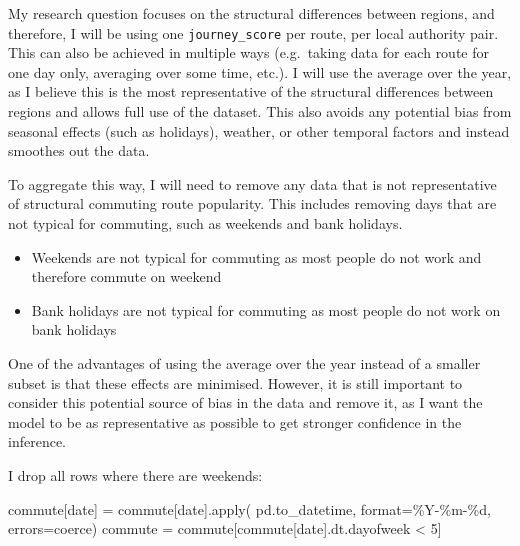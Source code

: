 \documentclass[
  number]{elsarticle}
\newenvironment{Shaded}{\begin{snugshade}}{\end{snugshade}}
\newcommand{\BuiltInTok}[1]{\textcolor[rgb]{0.00,0.23,0.31}{#1}}
\newcommand{\DecValTok}[1]{\textcolor[rgb]{0.68,0.00,0.00}{#1}}
\newcommand{\NormalTok}[1]{\textcolor[rgb]{0.00,0.23,0.31}{#1}}
\newcommand{\OperatorTok}[1]{\textcolor[rgb]{0.37,0.37,0.37}{#1}}
\newcommand{\SpecialCharTok}[1]{\textcolor[rgb]{0.37,0.37,0.37}{#1}}
\newcommand{\StringTok}[1]{\textcolor[rgb]{0.13,0.47,0.30}{#1}}
\providecommand{\tightlist}{%
  \setlength{\itemsep}{0pt}\setlength{\parskip}{0pt}}
\begin{document}
My research question focuses on the structural differences between
regions, and therefore, I will be using one
\texttt{\textquotesingle{}journey\_score\textquotesingle{}} per route,
per local authority pair. This can also be achieved in multiple ways
(e.g.~taking data for each route for one day only, averaging over some
time, etc.). I will use the average over the year, as I believe this is
the most representative of the structural differences between regions
and allows full use of the dataset. This also avoids any potential bias
from seasonal effects (such as holidays), weather, or other temporal
factors and instead smoothes out the data.

To aggregate this way, I will need to remove any data that is not
representative of structural commuting route popularity. This includes
removing days that are not typical for commuting, such as weekends and
bank holidays.

\begin{itemize}
\tightlist
\item
  Weekends are not typical for commuting as most people do not work and
  therefore commute on weekend
\item
  Bank holidays are not typical for commuting as most people do not work
  on bank holidays
\end{itemize}

One of the advantages of using the average over the year instead of a
smaller subset is that these effects are minimised. However, it is still
important to consider this potential source of bias in the data and
remove it, as I want the model to be as representative as possible to
get stronger confidence in the inference.

I drop all rows where there are weekends:

\begin{Shaded}
\begin{Highlighting}[]
\NormalTok{commute[}\StringTok{\textquotesingle{}date\textquotesingle{}}\NormalTok{] }\OperatorTok{=}\NormalTok{ commute[}\StringTok{\textquotesingle{}date\textquotesingle{}}\NormalTok{].}\BuiltInTok{apply}\NormalTok{(}
\NormalTok{    pd.to\_datetime, }\BuiltInTok{format}\OperatorTok{=}\StringTok{\textquotesingle{}\%Y{-}\%m{-}}\SpecialCharTok{\%d}\StringTok{\textquotesingle{}}\NormalTok{, errors}\OperatorTok{=}\StringTok{\textquotesingle{}coerce\textquotesingle{}}\NormalTok{)}
\NormalTok{commute }\OperatorTok{=}\NormalTok{ commute[commute[}\StringTok{\textquotesingle{}date\textquotesingle{}}\NormalTok{].dt.dayofweek }\OperatorTok{\textless{}} \DecValTok{5}\NormalTok{]}
\end{Highlighting}
\end{Shaded}
\end{document}
